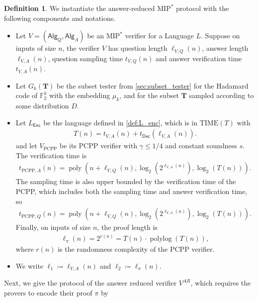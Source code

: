 \documentclass[10pt,a4paper]{article}
\theoremstyle{plain}
\theoremstyle{definition}
\newtheorem{definition}[theorem]{Definition}
\newcommand{\poly} {\ensuremath{\operatorname{poly}}}
\newcommand{\polylog} {\ensuremath{\operatorname{polylog}}}
\newcommand{\1}{\mathbb{1}} %
\newcommand{\bF}{\mathbb{F}}
\newcommand{\bT}{\pmb{T}}
\newcommand{\PCPP}{\mathrm{PCPP}}
\newcommand{\Enc}{\mathsf{Enc}}
\newcommand{\Dec}{\mathsf{Dec}}
\newcommand{\Alg}{\mathsf{Alg}}
\newcommand{\MIP}{\mathrm{MIP}}
\begin{document}
\begin{definition}
    \label{def:params}
    We instantiate the answer-reduced $\MIP^\ast$ protocol with the following components and notations.
    \begin{itemize}
        \item Let $V = (\Alg_Q, \Alg_A)$ be an $\MIP^\ast$ verifier for a Language $L$.
        Suppose on inputs of size $n$, the verifier $V$ has question length $\ell_{V,Q}(n)$,
        answer length $\ell_{V,A}(n)$, question sampling time $t_{V,Q}(n)$ and answer verification time $t_{V,A}(n)$.
        \item Let $G_k(\bT)$ be the subset tester from \cref{sec:subset_tester} for the Hadamard code of $\bF_2^k$ with the embedding $\mu_k$, and for
        the subset $\bT$ sampled according to some distribution $D$.
        \item Let $L_{\Enc}$ be the language defined in \cref{def:L_enc}, which is in $\text{TIME}(T)$ with
        \begin{align*}
            T(n) = t_{V,A}(n) + t_{\Dec}(\ell_{V,A}(n)).
        \end{align*}
        and let $V_{\PCPP}$ be its $\PCPP$ verifier with 
        $\gamma \leq 1/4$ and constant soundness $s$. 
        The verification time is 
        \begin{align*}
            t_{\PCPP,A}(n) = \poly(n+\ell_{V,Q}(n), \log_2(2^{\ell_{V,A}(n)}), \log_2(T(n))).
        \end{align*}
        The sampling time is also upper bounded by the verification time of the PCPP, which includes both the sampling time and answer verification time, so
        \begin{align*}
            t_{\PCPP,Q}(n) = \poly(n+\ell_{V,Q}(n), \log_2(2^{\ell_{V,A}(n)}), \log_2(T(n))).
        \end{align*}
        Finally, on inputs of size $n$, the proof length is
        \begin{align*}
            \ell_\pi(n) = 2^{r(n)} = T(n)\cdot \polylog(T(n)),
        \end{align*}
        where $r(n)$ is the randomness complexity of the PCPP verifier.
        \item We write $\ell_1 \coloneqq \ell_{V,A}(n)$ and $\ell_2 \coloneqq \ell_{\pi}(n)$.
    \end{itemize}
\end{definition}
Next, we give the protocol of the answer reduced verifier $V^{AR}$, which requires the provers to encode their proof $\pi$ by
\end{document}
